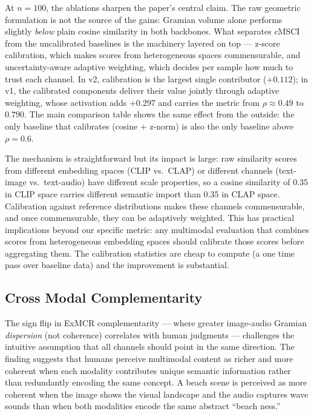 \documentclass[a4paper,fleqn]{cas-sc}
\begin{document}
\begin{itemize}
At $n = 100$, the ablations sharpen the paper's central claim. The raw geometric formulation is not the source of the gains: Gramian volume alone performs slightly \emph{below} plain cosine similarity in both backbones. What separates cMSCI from the uncalibrated baselines is the machinery layered on top — z-score calibration, which makes scores from heterogeneous spaces commensurable, and uncertainty-aware adaptive weighting, which decides per sample how much to trust each channel. In v2, calibration is the largest single contributor ($+0.112$); in v1, the calibrated components deliver their value jointly through adaptive weighting, whose activation adds $+0.297$ and carries the metric from $\rho \approx 0.49$ to $0.790$. The main comparison table shows the same effect from the outside: the only baseline that calibrates (cosine + z-norm) is also the only baseline above $\rho = 0.6$.

The mechanism is straightforward but its impact is large: raw similarity scores from different embedding spaces (CLIP vs.\ CLAP) or different channels (text-image vs.\ text-audio) have different scale properties, so a cosine similarity of 0.35 in CLIP space carries different semantic import than 0.35 in CLAP space. Calibration against reference distributions makes these channels commensurable, and once commensurable, they can be adaptively weighted. This has practical implications beyond our specific metric: any multimodal evaluation that combines scores from heterogeneous embedding spaces should calibrate those scores before aggregating them. The calibration statistics are cheap to compute (a one time pass over baseline data) and the improvement is substantial.

\subsection{Cross Modal Complementarity}\label{sec:complementarity-discussion}

The sign flip in ExMCR complementarity — where greater image-audio Gramian \emph{dispersion} (not coherence) correlates with human judgments — challenges the intuitive assumption that all channels should point in the same direction. The finding suggests that humans perceive multimodal content as richer and more coherent when each modality contributes unique semantic information rather than redundantly encoding the same concept. A beach scene is perceived as more coherent when the image shows the visual landscape and the audio captures wave sounds than when both modalities encode the same abstract ``beach ness.''


\end{itemize}
\end{document}
